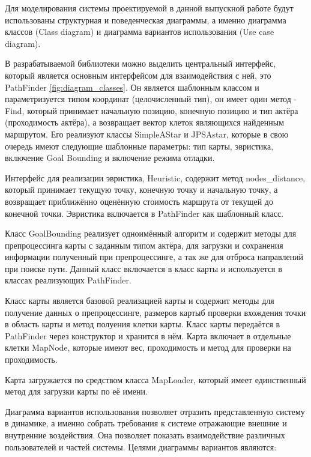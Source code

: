 Для моделирования системы проектируемой в данной выпускной работе будут использованы структурная и поведенческая диаграммы, а именно диаграмма классов (Class diagram) и диаграмма вариантов использования (Use case diagram).



В разрабатываемой библиотеки можно выделить центральный интерфейс, который является основным интерфейсом для взаимодействия с ней, это PathFinder \cref{fig:diagram_classes}. Он является шаблонным классом и параметризуется типом координат (целочисленный тип), он имеет один метод - Find, который принимает начальную позицию, конечную позицию и тип актёра (проходимость актёра), а возвращает вектор клеток являющихся найденным маршрутом. Его реализуют классы SimpleAStar и JPSAstar, которые в свою очередь имеют следующие шаблонные параметры: тип карты, эвристика, включение Goal Bounding и включение режима отладки.  

Интерфейс для реализации эвристика, Heuristic, содержит метод nodes\_distance, который принимает текущую точку, конечную точку и начальную точку, а возвращает приближённо оценённую стоимость маршрута от текущей до конечной точки. Эвристика включается в PathFinder как шаблонный класс.

Класс GoalBounding реализует одноимённый алгоритм и содержит методы для препроцессинга карты с заданным типом актёра, для загрузки и сохранения информации полученный при препроцессинге, а так же для отброса направлений при поиске пути. Данный класс включается в класс карты и используется в классах реализующих PathFinder.

Класс карты является базовой реализацией карты и содержит методы для получение данных о препроцессинге, размеров картыб проверки вхождения точки в область карты и метод полуения клетки карты. Класс карты передаётся в PathFinder через конструктор и хранится в нём. Карта включает в отдельные клетки MapNode, которые имеют вес, проходимость и метод для проверки на проходимость.

Карта загружается по средством класса MapLoader, который имеет единственный метод для загрузки карты по её имени.

Диаграмма вариантов использования позволяет отразить представленную систему в динамике, а именно собрать требования к системе отражающие внешние и внутренние воздействия. Она позволяет показать взаимодействие различных пользователей и частей системы. Целями диаграммы вариантов являются:


